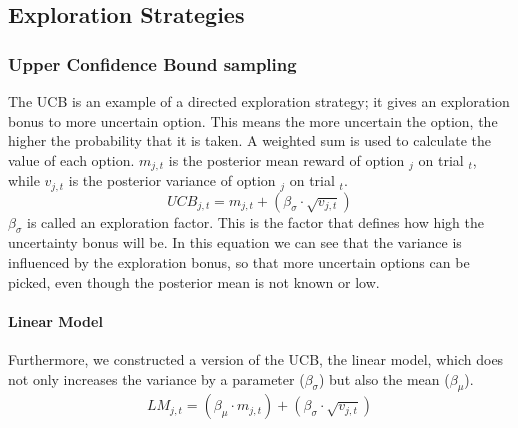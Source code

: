 \subsection{Exploration Strategies}

\subsubsection{Upper Confidence Bound sampling}
The UCB \citep{auer2002finite} is an example of a directed exploration strategy; it gives an exploration bonus to more uncertain option. This means the more uncertain the option, the higher the probability that it is taken. A weighted sum is used to calculate the value of each option. $m_{j,t}$ is the posterior mean reward of option $_j$ on trial $_t$, while $v_{j,t}$ is the posterior variance of option $_j$ on trial $_t$.
\begin{equation}
UCB_{j,t}=m_{j,t}+(\beta_{\sigma} \cdot  \sqrt{v_{j,t}})
\end{equation}
$\beta_\sigma$ is called an exploration factor. This is the factor that defines how high the uncertainty bonus will be. In this equation we can see that the variance is influenced by the exploration bonus, so that more uncertain options can be picked, even though the posterior mean is not known or low.
\paragraph{Linear Model}
Furthermore, we constructed a version of the UCB, the linear model, which does not only increases the variance by a parameter ($\beta_\sigma$) but also the mean ($\beta_\mu$). 
\begin{equation}
    LM_{j,t}=(\beta_\mu \cdot m_{j,t})+(\beta_{\sigma} \cdot  \sqrt{v_{j,t}})
\end{equation}

